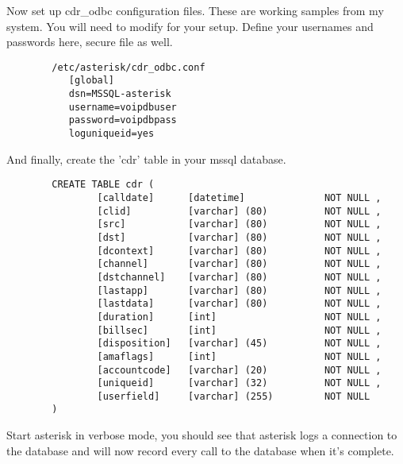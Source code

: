 		Now set up cdr\_odbc configuration files.  These are working samples
		from my system.  You will need to modify for your setup. Define
		your usernames and passwords here, secure file as well.
\begin{astlisting}
\begin{verbatim}
		/etc/asterisk/cdr_odbc.conf
		   [global]
		   dsn=MSSQL-asterisk
		   username=voipdbuser
		   password=voipdbpass
		   loguniqueid=yes
\end{verbatim}
\end{astlisting}
		And finally, create the 'cdr' table in your mssql database.
\begin{astlisting}
\begin{verbatim}
		CREATE TABLE cdr (
		        [calldate]      [datetime]              NOT NULL ,
		        [clid]          [varchar] (80)          NOT NULL ,
		        [src]           [varchar] (80)          NOT NULL ,
		        [dst]           [varchar] (80)          NOT NULL ,
		        [dcontext]      [varchar] (80)          NOT NULL ,
		        [channel]       [varchar] (80)          NOT NULL ,
		        [dstchannel]    [varchar] (80)          NOT NULL ,
		        [lastapp]       [varchar] (80)          NOT NULL ,
		        [lastdata]      [varchar] (80)          NOT NULL ,
		        [duration]      [int]                   NOT NULL ,
		        [billsec]       [int]                   NOT NULL ,
		        [disposition]   [varchar] (45)          NOT NULL ,
		        [amaflags]      [int]                   NOT NULL ,
		        [accountcode]   [varchar] (20)          NOT NULL ,
		        [uniqueid]      [varchar] (32)          NOT NULL ,
		        [userfield]     [varchar] (255)         NOT NULL
		)
\end{verbatim}
\end{astlisting}
		Start asterisk in verbose mode, you should see that asterisk
		logs a connection to the database and will now record every
		call to the database when it's complete.

